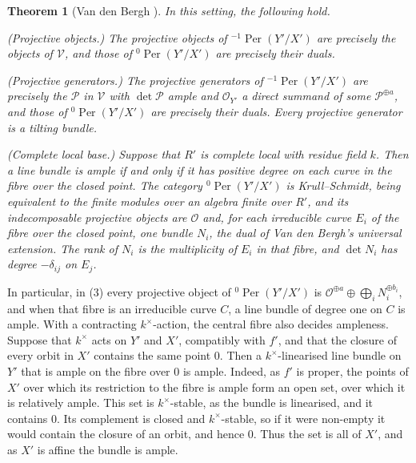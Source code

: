 \documentclass[11pt]{amsart}
\numberwithin{table}{section}
\numberwithin{figure}{section}
\numberwithin{equation}{section}
\newtheorem{thm}{Theorem}[section]
\theoremstyle{definition}
\theoremstyle{plain}
\newcommand{\cO}{\mathcal{O}}
\DeclareMathOperator{\Per}{Per}
\begin{document}
\begin{thm}[{Van den Bergh \cite[Props~3.2.6, 3.2.7, Cor~3.2.8, Lemma~3.4.5, Prop~3.5.4, Thm~3.5.5, (3.11)]{VdB}}]\label{thm:VdB}
In this setting, the following hold.
\begin{thmlist}
\item (Projective objects.) The projective objects of ${}^{-1}\Per(Y'/X')$ are precisely the objects of $\mathcal V$, and those of ${}^{0}\Per(Y'/X')$ are precisely their duals.
\item (Projective generators.) The projective generators of ${}^{-1}\Per(Y'/X')$ are precisely the $\mathcal P$ in $\mathcal V$ with $\det \mathcal P$ ample and $\cO_{Y'}$ a direct summand of some $\mathcal P^{\oplus a}$, and those of ${}^{0}\Per(Y'/X')$ are precisely their duals. Every projective generator is a tilting bundle.
\item (Complete local base.) Suppose that $R'$ is complete local with residue field $k$. Then a line bundle is ample if and only if it has positive degree on each curve in the fibre over the closed point. The category ${}^{0}\Per(Y'/X')$ is Krull--Schmidt, being equivalent to the finite modules over an algebra finite over $R'$, and its indecomposable projective objects are $\cO$ and, for each irreducible curve $E_i$ of the fibre over the closed point, one bundle $N_i$, the dual of Van den Bergh's universal extension. The rank of $N_i$ is the multiplicity of $E_i$ in that fibre, and $\det N_i$ has degree $-\delta_{ij}$ on $E_j$.
\end{thmlist}
\end{thm}

In particular, in (3) every projective object of ${}^{0}\Per(Y'/X')$ is $\cO^{\oplus a} \oplus \bigoplus_i N_i^{\oplus b_i}$, and when that fibre is an irreducible curve $C$, a line bundle of degree one on $C$ is ample. With a contracting $k^\times$-action, the central fibre also decides ampleness. Suppose that $k^\times$ acts on $Y'$ and $X'$, compatibly with $f'$, and that the closure of every orbit in $X'$ contains the same point $0$. Then a $k^\times$-linearised line bundle on $Y'$ that is ample on the fibre over $0$ is ample. Indeed, as $f'$ is proper, the points of $X'$ over which its restriction to the fibre is ample form an open set, over which it is relatively ample. This set is $k^\times$-stable, as the bundle is linearised, and it contains $0$. Its complement is closed and $k^\times$-stable, so if it were non-empty it would contain the closure of an orbit, and hence $0$. Thus the set is all of $X'$, and as $X'$ is affine the bundle is ample.
\end{document}
